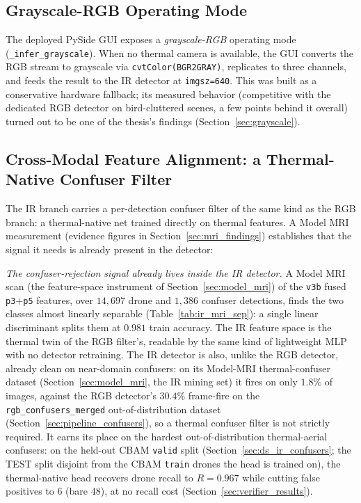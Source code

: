 \subsection{Grayscale-RGB Operating Mode}
\label{sec:ir_grayscale_mode}

The deployed PySide GUI exposes a \emph{grayscale-RGB} operating mode (\texttt{\_infer\_\allowbreak grayscale}). When no thermal camera is available, the GUI converts the RGB stream to grayscale via \texttt{cvtColor(\allowbreak BGR2GRAY)}, replicates to three channels, and feeds the result to the IR detector at \texttt{imgsz=640}. This was built as a conservative hardware fallback; its measured behavior (competitive with the dedicated RGB detector on bird-cluttered scenes, a few points behind it overall) turned out to be one of the thesis's findings (Section~\ref{sec:grayscale}).

\subsection{Cross-Modal Feature Alignment: a Thermal-Native Confuser Filter}
\label{sec:ir_xmodal_verifier}

The IR branch carries a per-detection confuser filter of the same kind as the RGB branch: a thermal-native net trained directly on thermal features. A Model MRI measurement (evidence figures in Section~\ref{sec:mri_findings}) establishes that the signal it needs is already present in the detector:

\emph{The confuser-rejection signal already lives inside the IR detector.} A Model MRI scan (the feature-space instrument of Section~\ref{sec:model_mri}) of the \texttt{v3b} fused \texttt{p3}+\texttt{p5} features, over $14{,}697$ drone and $1{,}386$ confuser detections, finds the two classes almost linearly separable (Table~\ref{tab:ir_mri_sep}): a single linear discriminant splits them at $0.981$ train accuracy. The IR feature space is the thermal twin of the RGB filter's, readable by the same kind of lightweight MLP with no detector retraining. The IR detector is also, unlike the RGB detector, already clean on near-domain confusers: on its Model-MRI thermal-confuser dataset (Section~\ref{sec:model_mri}, the IR mining set) it fires on only $1.8\%$ of images, against the RGB detector's $30.4\%$ frame-fire on the \texttt{rgb\_confusers\_merged} out-of-distribution dataset (Section~\ref{sec:pipeline_confusers}), so a thermal confuser filter is not strictly required. It earns its place on the hardest out-of-distribution thermal-aerial confusers: on the held-out CBAM \texttt{valid} split (Section~\ref{sec:ds_ir_confusers}; the TEST split disjoint from the CBAM \texttt{train} drones the head is trained on), the thermal-native head recovers drone recall to $R=0.967$ while cutting false positives to $6$ (bare $48$), at no recall cost (Section~\ref{sec:verifier_results}).

